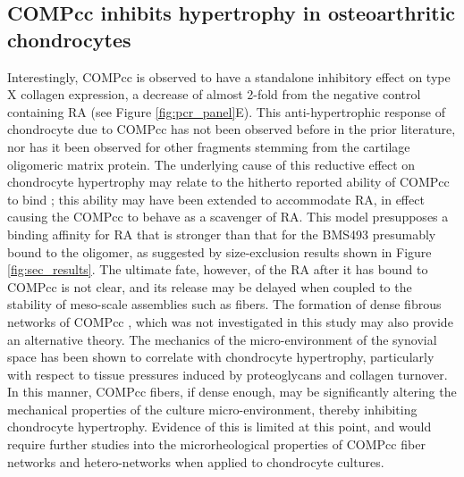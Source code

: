 \begin{refsection}
\subsection{COMPcc inhibits hypertrophy in osteoarthritic chondrocytes}
\label{sec:discuss_hypertrophy}
Interestingly, COMPcc is observed to have a standalone inhibitory effect on type X
collagen expression, a decrease of almost 2-fold from the negative control
containing RA (see Figure \ref{fig:pcr_panel}E). This anti-hypertrophic response
of chondrocyte due to COMPcc has not been observed before in the prior literature,
nor has it been observed for other fragments stemming from the cartilage
oligomeric matrix protein. The underlying cause of this reductive effect on
chondrocyte hypertrophy may relate to the hitherto reported ability of COMPcc to
bind ;\cite{Guo1998} this ability may have been
extended to accommodate RA, in effect causing the COMPcc to behave as a scavenger
of RA. This model presupposes a binding affinity for RA that is stronger than
that for the BMS493 presumably bound to the oligomer, as suggested by
size-exclusion results shown in Figure \ref{fig:sec_results}. The ultimate fate,
however, of the RA after it has bound to COMPcc is not clear, and its release may
be delayed when coupled to the stability of meso-scale assemblies such as
fibers. The formation of dense fibrous networks of COMPcc , which
was not investigated in this study may also provide an alternative theory. The
mechanics of the micro-environment of the synovial space has been shown to
correlate with chondrocyte hypertrophy, particularly with respect to tissue
pressures induced by proteoglycans and collagen turnover.\cite{VanDonkelaar2012}
In this manner, COMPcc fibers, if dense enough, may be significantly altering the
mechanical properties of the culture micro-environment, thereby inhibiting
chondrocyte hypertrophy. Evidence of this is limited at this point, and would
require further studies into the microrheological properties of COMPcc fiber
networks and hetero-networks when applied to chondrocyte cultures.


\end{refsection}
